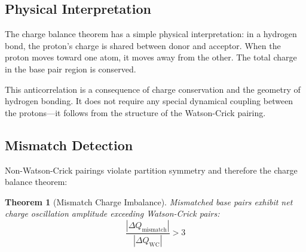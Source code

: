 \documentclass[twocolumn,10pt]{article}
\newtheorem{theorem}{Theorem}[section]
\theoremstyle{remark}
\begin{document}
\subsection{Physical Interpretation}

The charge balance theorem has a simple physical interpretation: in a hydrogen bond, the proton's charge is shared between donor and acceptor. When the proton moves toward one atom, it moves away from the other. The total charge in the base pair region is conserved.

This anticorrelation is a consequence of charge conservation and the geometry of hydrogen bonding. It does not require any special dynamical coupling between the protons---it follows from the structure of the Watson-Crick pairing.

\subsection{Mismatch Detection}

Non-Watson-Crick pairings violate partition symmetry and therefore the charge balance theorem:

\begin{theorem}[Mismatch Charge Imbalance]
\label{thm:mismatch}
Mismatched base pairs exhibit net charge oscillation amplitude exceeding Watson-Crick pairs:
\begin{equation}
\frac{|\Delta Q_{\mathrm{mismatch}}|}{|\Delta Q_{\mathrm{WC}}|} > 3
\end{equation}
\end{theorem}
\end{document}
